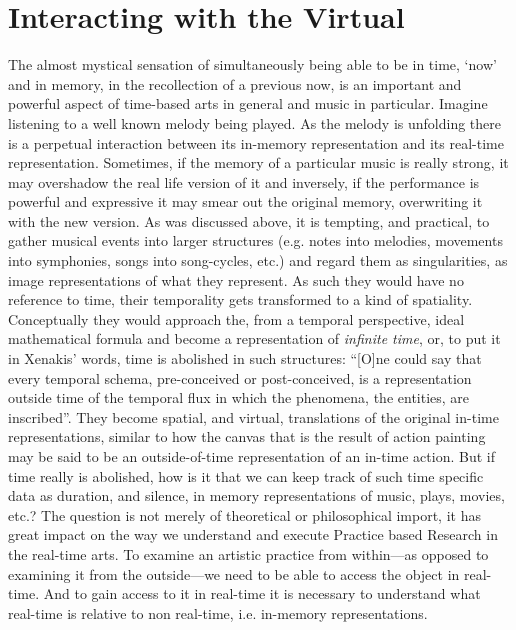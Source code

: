 \section{Interacting with the Virtual}
\label{sec:inter-with-virt}

The almost mystical sensation of simultaneously being able to be in time, `now' and in memory, in the recollection of a previous now, is an important and powerful aspect of time-based arts in general and music in particular. Imagine listening to a well known melody being played. As the melody is unfolding there is a perpetual interaction between its in-memory representation and its real-time representation. Sometimes, if the memory of a particular music is really strong, it may overshadow the real life version of it and inversely, if the performance is powerful and expressive it may smear out the original memory, overwriting it with the new version. As was discussed above, it is tempting, and practical, to gather musical events into larger structures (e.g. notes into melodies, movements into symphonies, songs into song-cycles, etc.) and regard them as singularities, as image representations of what they represent. As such they would have no reference to time, their temporality gets transformed to a kind of spatiality. Conceptually they would approach the, from a temporal perspective, ideal mathematical formula and become a representation of \emph{infinite time}, \parencite{roads} or, to put it in Xenakis' words, time is abolished in such structures: ``[O]ne could say that every temporal schema, pre-conceived or post-conceived, is a representation outside time of the temporal flux in which the phenomena, the entities, are  inscribed''. \parencite[264]{xenakis71} They become spatial, and virtual, translations of the original in-time representations, similar to how the canvas that is the result of action painting may be said to be an outside-of-time representation of an in-time action. But if time really is abolished, how is it that we can keep track of such time specific data as duration, and silence, in memory representations of music, plays, movies, etc.? The question is not merely of theoretical or philosophical import, it has great impact on the way we understand and execute Practice based Research in the real-time arts. To examine an artistic practice from within---as opposed to examining it from the outside---we need to be able to access the object in real-time. And to gain access to it in real-time it is necessary to understand what real-time is relative to non real-time, i.e. in-memory representations.

